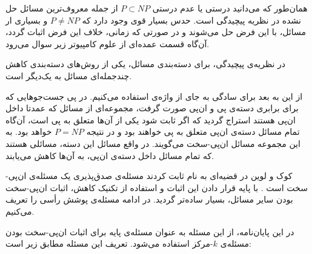 همان‌طور که می‌دانید درستی یا عدم درستی $P \subset NP$ از جمله معروف‌ترین مسائل حل نشده در نظریه پیچیدگی است. حدس بسیار قوی وجود دارد که $P \neq NP$ و بسیاری ار مسائل، با این فرض حل می‌شوند و در صورتی که زمانی، خلاف این فرض اثبات گردد، آن‌گاه قسمت عمده‌ای از علوم کامپیوتر زیر سوال می‌رود.

در نظریه‌ی پیچیدگی، برای دسته‌بندی مسائل، یکی از روش‌های دسته‌بندی کاهش چند‌جمله‌ای مسائل به یک‌دیگر است. 


از این به بعد برای سادگی به جای  از واژه‌ی  استفاده می‌کنیم. در پی جست‌جوهایی که برای برابری دسته‌ی پی و ان‌پی صورت گرفت، مجموعه‌ای از مسائل که عمدتا داخل ان‌پی هستند استراج گردید که اگر ثابت شود یکی از آن‌ها متعلق به پی است، آن‌گاه تمام مسائل دسته‌ی ان‌پی متعلق به پی خواهند بود و در نتیجه $P = NP$ خواهد بود. به این مجموعه مسائل ان‌پی-سخت می‌گویند. در واقع مسائل این دسته، مسائلی هستند که تمام مسائل داخل دسته‌ی ان‌پی، به آن‌ها کاهش می‌یابند.

کوک و لوین در قضیه‌ای به نام  ثابت کردند مسئله‌ی صدق‌پذیری یک مسئله‌ی ان‌پی-سخت است . با پایه قرار دادن این اثبات و استفاده از تکنیک کاهش، اثبات ان‌پی-سخت بودن سایر مسائل، بسیار ساده‌تر گردید. در ادامه مسئله‌ی پوشش رأسی را تعریف می‌کنیم.

در این پایان‌نامه، از این مسئله به عنوان مسئله‌ی پایه برای اثبات ان‌پی-سخت بودن مسئله‌ی $k$-مرکز استفاده می‌شود. تعریف این مسئله مطابق زیر است:


